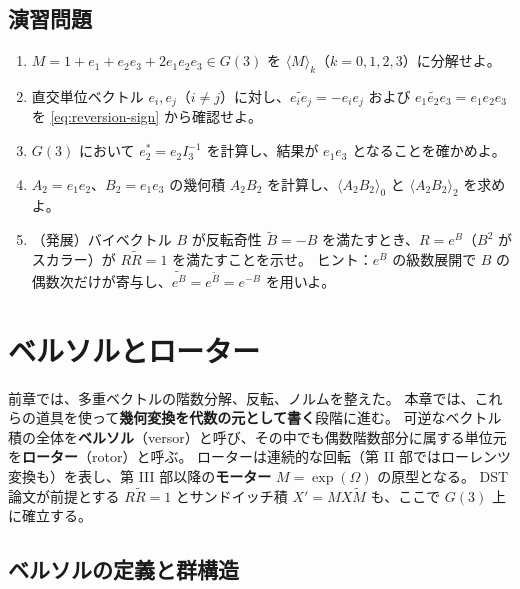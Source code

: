 \documentclass[dvipdfmx,a4paper,oneside]{jsbook}
\numberwithin{equation}{chapter}
\begin{document}
\section*{演習問題}

\begin{enumerate}[leftmargin=2em]
  \item \(M = 1 + e_1 + e_2 e_3 + 2e_1 e_2 e_3 \in G(3)\) を \(\langle M \rangle_k\)（\(k=0,1,2,3\)）に分解せよ。

  \item 直交単位ベクトル \(e_i,e_j\)（\(i\neq j\)）に対し、\(\widetilde{e_i e_j} = -e_i e_j\) および \(\widetilde{e_1 e_2 e_3} = e_1 e_2 e_3\) を \eqref{eq:reversion-sign} から確認せよ。

  \item \(G(3)\) において \(e_2^* = e_2 I_3^{-1}\) を計算し、結果が \(e_1 e_3\) となることを確かめよ。

  \item \(A_2 = e_1 e_2\)、\(B_2 = e_1 e_3\) の幾何積 \(A_2 B_2\) を計算し、\(\langle A_2 B_2 \rangle_0\) と \(\langle A_2 B_2 \rangle_2\) を求めよ。

  \item （発展）バイベクトル \(B\) が反転奇性 \(\widetilde{B}=-B\) を満たすとき、\(R = e^B\)（\(B^2\) がスカラー）が \(R\widetilde{R}=1\) を満たすことを示せ。
  ヒント：\(e^B\) の級数展開で \(B\) の偶数次だけが寄与し、\(\widetilde{e^B} = e^{\widetilde{B}} = e^{-B}\) を用いよ。
\end{enumerate}

\chapter{ベルソルとローター}

前章では、多重ベクトルの階数分解、反転、ノルムを整えた。
本章では、これらの道具を使って\textbf{幾何変換を代数の元として書く}段階に進む。
可逆なベクトル積の全体を\textbf{ベルソル}（versor）と呼び、その中でも偶数階数部分に属する単位元を\textbf{ローター}（rotor）と呼ぶ。
ローターは連続的な回転（第 II 部ではローレンツ変換も）を表し、第 III 部以降の\textbf{モーター} \(M=\exp(\Omega)\) の原型となる。
DST 論文が前提とする \(R\widetilde{R}=1\) とサンドイッチ積 \(X'=MX\widetilde{M}\) も、ここで \(G(3)\) 上に確立する。

\section{ベルソルの定義と群構造}
\end{document}
